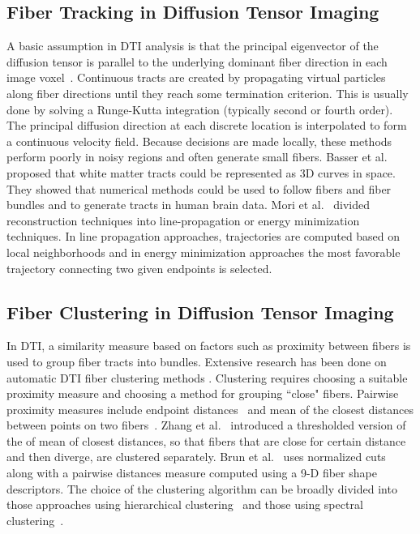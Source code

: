 \subsection {Fiber Tracking in Diffusion Tensor Imaging}
\label{subsec:fiberEx} 
A basic assumption in DTI analysis is that the principal eigenvector of the diffusion tensor is parallel to the underlying dominant fiber direction in each image voxel~\cite{Basser2002, Basser2000, Mori1999, Mori2002}. Continuous tracts are created by propagating virtual particles along fiber directions until they reach some termination criterion. 
This is usually done by solving a Runge-Kutta integration (typically second or fourth order). The principal diffusion direction at each discrete location is interpolated to form a continuous velocity field. 
Because decisions are made locally, these methods perform poorly in noisy regions and often generate small fibers. Basser et al.~\cite{Basser2002,Basser2000} proposed that white matter tracts could be represented as 3D curves in space. They showed that numerical methods could be used to follow fibers and fiber bundles and to generate tracts in human brain data. 
Mori et al.~\cite{Mori1999,Mori2002} divided reconstruction techniques into line-propagation or energy minimization techniques. In line propagation approaches, trajectories are computed based on local neighborhoods and in energy minimization approaches the most  favorable trajectory connecting two given endpoints is selected. 


\subsection {Fiber Clustering in Diffusion Tensor Imaging}
\label {subsec:fiberClus}
In DTI, a similarity measure based on factors such as proximity between fibers is used to group fiber tracts into bundles. Extensive research has been done on automatic DTI fiber clustering methods \cite{Brun2004,Brun2003,Corouge2004,westinMEDIA02,Zhang2008}. 
Clustering requires choosing a suitable proximity measure and choosing a method for grouping ``close" fibers.
Pairwise proximity measures include endpoint distances~\cite{Brun2003} and mean of the closest distances between points on two fibers~\cite{Corouge2004}. Zhang et al.~\cite{Zhang2008} introduced a thresholded version of the of mean of closest distances, so that fibers that are close for certain distance and then diverge, are clustered separately. Brun et al.~\cite{Brun2004} uses normalized cuts along with a pairwise distances  measure computed using a 9-D fiber shape descriptors. The choice of the clustering algorithm can be broadly divided into those approaches using hierarchical clustering~\cite{Moberts2005, Zhang2008} and those using spectral clustering~\cite{ Brun2004,jonasson2005, ODonnell2007}.
 
